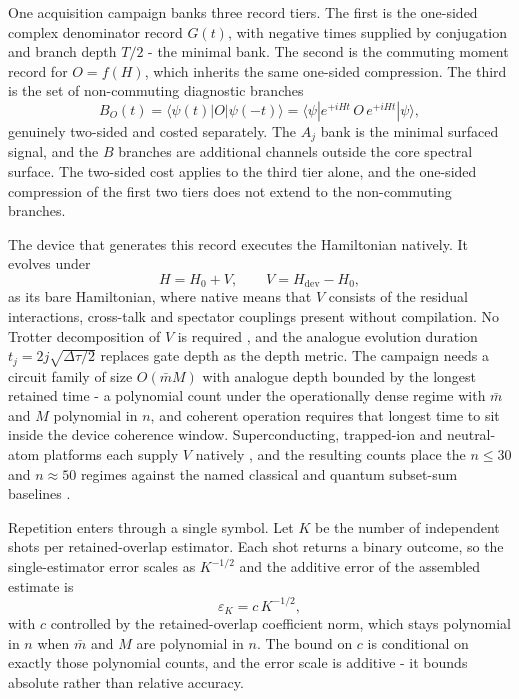 One acquisition campaign banks three record tiers. The first is the one-sided complex denominator record $G(t)$, with negative times supplied by conjugation and branch depth $T/2$ - the minimal bank. The second is the commuting moment record for $O = f(H)$, which inherits the same one-sided compression. The third is the set of non-commuting diagnostic branches
\begin{equation}\label{def:record-architecture-three-tier}
B_O(t) = \langle\psi(t)|O|\psi(-t)\rangle = \langle\psi|e^{+iHt}\,O\,e^{+iHt}|\psi\rangle ,
\end{equation}
genuinely two-sided and costed separately. The $A_j$ bank is the minimal surfaced signal, and the $B$ branches are additional channels outside the core spectral surface. The two-sided cost applies to the third tier alone, and the one-sided compression of the first two tiers does not extend to the non-commuting branches.

The device that generates this record executes the Hamiltonian natively. It evolves under
\begin{equation}\label{def:native-hardware-V}
H = H_0 + V, \qquad V = H_{\mathrm{dev}} - H_0 ,
\end{equation}
as its bare Hamiltonian, where native means that $V$ consists of the residual interactions, cross-talk and spectator couplings present without compilation. No Trotter decomposition of $V$ is required \cite{lloyd1996universal}, and the analogue evolution duration $t_j = 2j\sqrt{\Delta\tau/2}$ replaces gate depth as the depth metric. The campaign needs a circuit family of size $O(\bar m M)$ with analogue depth bounded by the longest retained time - a polynomial count under the operationally dense regime with $\bar m$ and $M$ polynomial in $n$, and coherent operation requires that longest time to sit inside the device coherence window. Superconducting, trapped-ion and neutral-atom platforms each supply $V$ natively \cite{yan2018tunable, kamakari2022digital}, and the resulting counts place the $n \le 30$ and $n \approx 50$ regimes against the named classical and quantum subset-sum baselines \cite{hgj2010, bonnetain2020improved}.

Repetition enters through a single symbol. Let $K$ be the number of independent shots per retained-overlap estimator. Each shot returns a binary outcome, so the single-estimator error scales as $K^{-1/2}$ and the additive error of the assembled estimate is
\begin{equation}\label{def:shot-budget-K}
\varepsilon_K = c\,K^{-1/2},
\end{equation}
with $c$ controlled by the retained-overlap coefficient norm, which stays polynomial in $n$ when $\bar m$ and $M$ are polynomial in $n$. The bound on $c$ is conditional on exactly those polynomial counts, and the error scale is additive - it bounds absolute rather than relative accuracy.

